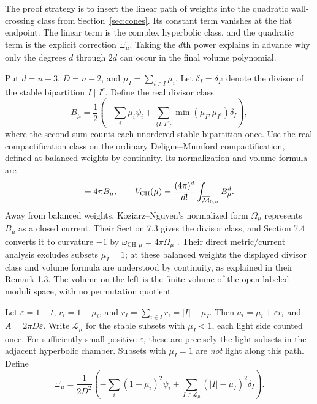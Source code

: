 The proof strategy is to insert the linear path of weights into
the quadratic wall-crossing class from Section~\ref{sec:cones}.
Its constant term vanishes at the flat endpoint. The linear term
is the complex hyperbolic class, and the quadratic term is the
explicit correction $\Xi_\mu$. Taking the $d$th power explains
in advance why only the degrees $d$ through $2d$ can occur in the
final volume polynomial.

Put $d=n-3$, $D=n-2$, and $\mu_I=\sum_{i\in I}\mu_i$. Let
$\delta_I=\delta_{I^c}$ denote the divisor of the stable bipartition
$I\mid I^c$. Define the real divisor class
\begin{equation}
 B_\mu=\frac12\left(
   -\sum_i\mu_i\psi_i+
   \sum_{\{I,I^c\}}\min(\mu_I,\mu_{I^c})\delta_I\right),
 \label{eq:CHclassB}
\end{equation}
where the second sum counts each unordered stable bipartition once.
Use the real compactification class on the ordinary
Deligne--Mumford compactification, defined at balanced weights by
continuity. Its normalization and volume formula are
\begin{equation}
 [\omega_{\mathrm{CH},\mu}]=4\pi B_\mu,\qquad
 V_{\mathrm{CH}}(\mu)=\frac{(4\pi)^d}{d!}
                     \int_{\MM_{0,n}}B_\mu^d.
 \label{eq:CHintersection}
\end{equation}
Away from balanced weights, Koziarz--Nguyen's normalized form
$\Omega_\mu$ represents $B_\mu$ as a closed current. Their
Section 7.3 gives the divisor class, and Section 7.4 converts it
to curvature $-1$ by
$\omega_{\mathrm{CH},\mu}=4\pi\Omega_\mu$
\cite[Theorem 1.1 and Sections 7.3--7.4]{KoziarzNguyen}.
Their direct metric/current analysis excludes subsets $\mu_I=1$;
at these balanced weights the displayed divisor class and volume
formula are understood by continuity, as explained in their
Remark 1.3. The volume on the left is the finite volume of the
open labeled moduli space, with no permutation quotient.

Let $\varepsilon=1-t$, $r_i=1-\mu_i$, and
$r_I=\sum_{i\in I}r_i=|I|-\mu_I$. Then
$a_i=\mu_i+\varepsilon r_i$ and $A=2\pi D\varepsilon$. Write
$\mathcal L_\mu$ for the stable subsets with $\mu_I<1$, each light
side counted once. For sufficiently small positive $\varepsilon$,
these are precisely the light subsets in the adjacent hyperbolic
chamber. Subsets with $\mu_I=1$ are \emph{not} light along this path.
Define
\begin{equation}
 \boxed{\quad
 \Xi_\mu=\frac{1}{2D^2}\left(
 -\sum_i(1-\mu_i)^2\psi_i+
 \sum_{I\in\mathcal L_\mu}(|I|-\mu_I)^2\delta_I\right).
 \quad}
 \label{eq:Xiclass}
\end{equation}

